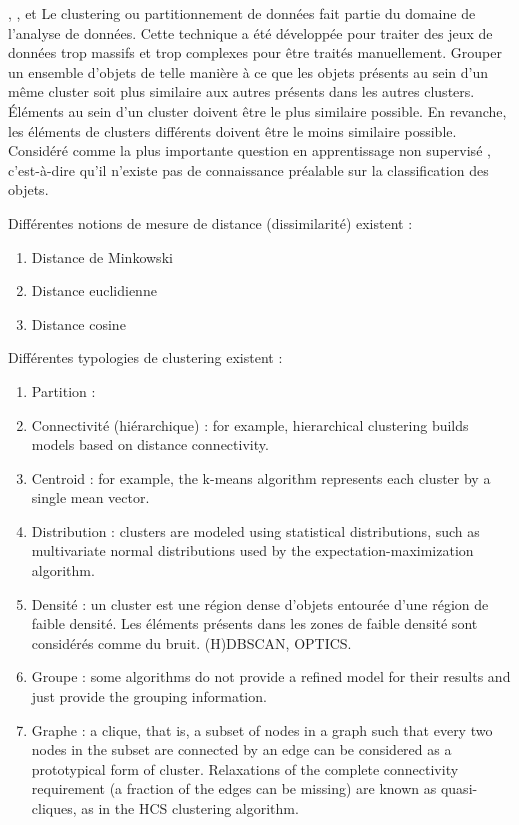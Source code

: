 \documentclass{llncs}
\begin{document}
\cite{Xu2015}, \cite{Andreopoulos2009}, \cite{Fahad2014} \cite{Tan2005} et \cite{Sajana2016}
Le clustering ou partitionnement de données fait partie du domaine de l'analyse de données. Cette technique a été développée pour traiter des jeux de données trop massifs et trop complexes pour être traités manuellement. Grouper un ensemble d'objets de telle manière à ce que les objets présents au sein d'un même cluster soit plus similaire aux autres présents dans les autres clusters. Éléments au sein d'un cluster doivent être le plus similaire possible. En revanche, les éléments de clusters différents doivent être le moins similaire possible. Considéré comme la plus importante question en apprentissage non supervisé \cite{Xu2015}, c'est-à-dire qu'il n'existe pas de connaissance préalable sur la classification des objets.

Différentes notions de mesure de distance (dissimilarité) existent :

\begin{enumerate}
  \item Distance de Minkowski
  \item Distance euclidienne
  \item Distance cosine
\end{enumerate}

Différentes typologies de clustering existent : 

\begin{enumerate}
  \item Partition : 
  \item Connectivité (hiérarchique) : for example, hierarchical clustering builds models based on distance connectivity.
  \item Centroid : for example, the k-means algorithm represents each cluster by a single mean vector.
  \item Distribution : clusters are modeled using statistical distributions, such as multivariate normal distributions used by the expectation-maximization algorithm.
  \item Densité : un cluster est une région dense d'objets entourée d'une région de faible densité. Les éléments présents dans les zones de faible densité sont considérés comme du bruit. (H)DBSCAN, OPTICS.
  \item Groupe : some algorithms do not provide a refined model for their results and just provide the grouping information.
  \item Graphe : a clique, that is, a subset of nodes in a graph such that every two nodes in the subset are connected by an edge can be considered as a prototypical form of cluster. Relaxations of the complete connectivity requirement (a fraction of the edges can be missing) are known as quasi-cliques, as in the HCS clustering algorithm.
\end{enumerate}
\end{document}
